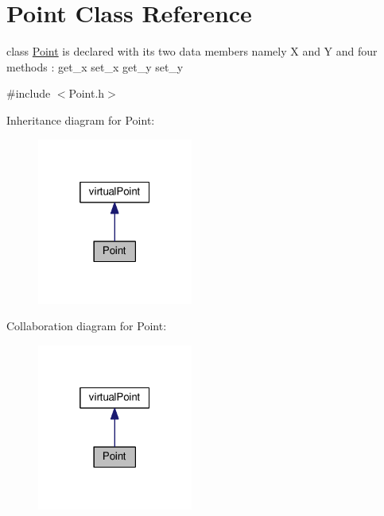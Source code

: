 \hypertarget{classPoint}{}\section{Point Class Reference}
\label{classPoint}


class \hyperlink{classPoint}{Point} is declared with its two data members namely X and Y and four methods \+: get\+\_\+x set\+\_\+x get\+\_\+y set\+\_\+y  




{\ttfamily \#include $<$Point.\+h$>$}



Inheritance diagram for Point\+:
\nopagebreak
\begin{figure}[H]
\begin{center}
\leavevmode
\includegraphics[width=145pt]{classPoint__inherit__graph}
\end{center}
\end{figure}


Collaboration diagram for Point\+:
\nopagebreak
\begin{figure}[H]
\begin{center}
\leavevmode
\includegraphics[width=145pt]{classPoint__coll__graph}
\end{center}
\end{figure}
